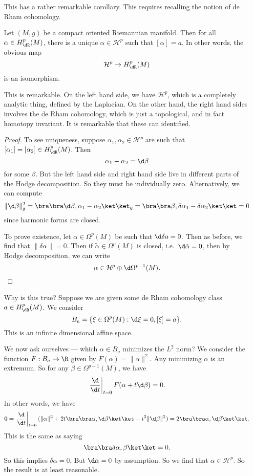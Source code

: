 \documentclass[a4paper]{article}
\begin{document}
This has a rather remarkable corollary. This requires recalling the notion of de Rham cohomology.
\begin{cor}
  Let $(M, g)$ be a compact oriented Riemannian manifold. Then for all $\alpha \in H_{\dR}^p(M)$, there is a unique $\alpha \in \mathcal{H}^p$ such that $[\alpha] = a$. In other words, the obvious map
  \[
    \mathcal{H}^p \to H_{\dR}^p(M)
  \]
  is an isomorphism.
\end{cor}
This is remarkable. On the left hand side, we have $\mathcal{H}^p$, which is a completely analytic thing, defined by the Laplacian. On the other hand, the right hand sides involves the de Rham cohomology, which is just a topological, and in fact homotopy invariant. It is remarkable that these can identified.

\begin{proof}
  To see uniqueness, suppose $\alpha_1, \alpha_2 \in \mathcal{H}^p$ are such that $[\alpha_1] = [\alpha_2] \in H_{\dR}^p(M)$. Then
  \[
    \alpha_1 - \alpha_2 = \d \beta
  \]
  for some $\beta$. But the left hand side and right hand side live in different parts of the Hodge decomposition. So they must be individually zero. Alternatively, we can compute
  \[
    \|\d \beta\|_g^2 = \bra\bra \d \beta, \alpha_1- \alpha_2\ket\ket_g = \bra \bra \beta, \delta \alpha_1 - \delta \alpha_2\ket\ket = 0
  \]
  since harmonic forms are closed.

  To prove existence, let $\alpha \in \Omega^p(M)$ be such that $\d \delta a = 0$. Then as before, we find that $\|\delta \alpha\| = 0$. Then if $\tilde{\alpha} \in \Omega^p(M)$ is closed, i.e.\ $\d \tilde{\alpha} = 0$, then by Hodge decomposition, we can write
  \[
    \alpha \in \mathcal{H}^p \oplus \d \Omega^{p - 1}(M).
  \] %
\end{proof}
Why is this true? Suppose we are given some de Rham cohomology class $a \in H_{\dR}^p(M)$. We consider
\[
  B_a = \{\xi \in \Omega^p(M): \d \xi = 0, [\xi] = a\}.
\]
This is an infinite dimensional affine space.

We now ask ourselves --- which $\alpha \in B_a$ minimizes the $L^2$ norm? We consider the function $F: B_a \to \R$ given by $F(\alpha) = \|\alpha\|^2$. Any minimizing $\alpha$ is an extremum. So for any $\beta \in \Omega^{p - 1}(M)$, we have
\[
  \left.\frac{\d}{\d t}\right|_{t = 0} F(\alpha + t \d \beta) = 0.
\]
In other words, we have
\[
  0 = \left.\frac{\d}{\d t}\right|_{t = 0} (\|\alpha\|^2 + 2t \bra \bra \alpha, \d \beta\ket\ket + t^2 \|\d \beta\|^2) = 2 \bra\bra \alpha, \d \beta\ket\ket.
\]
This is the same as saying
\[
  \bra \bra \delta \alpha, \beta\ket\ket = 0.
\]
So this implies $\delta \alpha = 0$. But $\d \alpha = 0$ by assumption. So we find that $\alpha \in \mathcal{H}^p$. So the result is at least reasonable.
\end{document}
